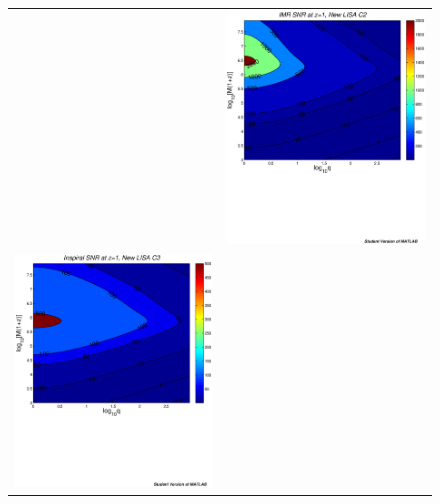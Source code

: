 \documentclass{iopart}
\begin{document}
\begin{figure}[H]
\begin{center}
\begin{tabular}{cc}
&\includegraphics[scale=0.41,clip=true]{FigEmanuele/C2IMRSNRContourz1.ps}\\
\includegraphics[scale=0.41,clip=true]{FigEmanuele/C3InspSNRContourz1.ps}

\end{tabular}
\end{center}
\end{figure}
\end{document}
